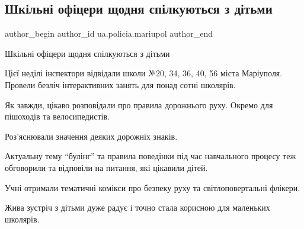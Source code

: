  
 
 
 
 

\subsection{Шкільні офіцери щодня спілкуються з дітьми}
\label{sec:14_05_2021.fb.ua.policia.mariupol.1.shk_ln__of_tseri_shc}

\ifcmt
 author_begin
   author_id ua.policia.mariupol
 author_end
\fi

Шкільні офіцери щодня спілкуються з дітьми

Цієї неділі інспектори відвідали школи №20, 34, 36, 40, 56 міста Маріуполя.
Провели безліч інтерактивних занять для понад сотні школярів.

Як завжди, цікаво розповідали про правила дорожнього руху. Окремо для пішоходів
та велосипедистів.

Роз'яснювали значення деяких дорожніх знаків.

Актуальну тему \enquote{булінг} та правила поведінки під час навчального процесу теж
обговорили та відповіли на питання, які цікавили дітей.

Учні отримали тематичні комікси про безпеку руху та світлоповертальні флікери. 

Жива зустріч з дітьми дуже радує і точно стала корисною для маленьких школярів.

